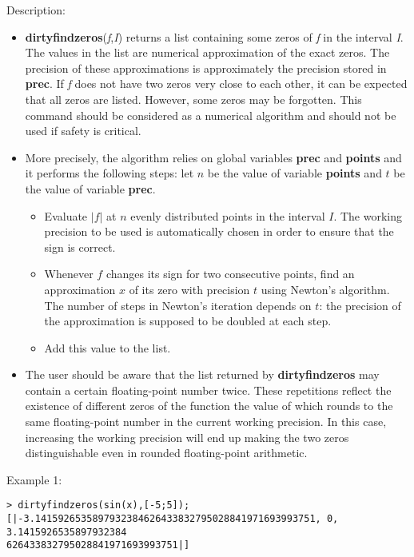 \noindent Description: \begin{itemize}

\item \textbf{dirtyfindzeros}(\emph{f},\emph{I}) returns a list containing some zeros of \emph{f} in the
   interval \emph{I}. The values in the list are numerical approximation of the exact
   zeros. The precision of these approximations is approximately the precision
   stored in \textbf{prec}. If \emph{f} does not have two zeros very close to each other, it 
   can be expected that all zeros are listed. However, some zeros may be
   forgotten. This command should be considered as a numerical algorithm and
   should not be used if safety is critical.

\item More precisely, the algorithm relies on global variables \textbf{prec} and \textbf{points} and it performs the following steps: 
   let $n$ be the value of variable \textbf{points} and $t$ be the value
   of variable \textbf{prec}.
   \begin{itemize}
   \item Evaluate $|f|$ at $n$ evenly distributed points in the interval $I$.
     The working precision to be used is automatically chosen in order to ensure that the sign
     is correct.
   \item Whenever $f$ changes its sign for two consecutive points,
     find an approximation $x$ of its zero with precision $t$ using
     Newton's algorithm. The number of steps in Newton's iteration depends on $t$:
     the precision of the approximation is supposed to be doubled at each step.
   \item Add this value to the list.
   \end{itemize}

\item The user should be aware that the list returned by \textbf{dirtyfindzeros} may
   contain a certain floating-point number twice. These repetitions
   reflect the existence of different zeros of the function the value of
   which rounds to the same floating-point number in the current working
   precision. In this case, increasing the working precision will end up
   making the two zeros distinguishable even in rounded floating-point
   arithmetic.
\end{itemize}
\noindent Example 1: 
\begin{center}\begin{minipage}{15cm}\begin{Verbatim}[frame=single,commandchars=\\\|\~]
> dirtyfindzeros(sin(x),[-5;5]);
[|-3.1415926535897932384626433832795028841971693993751, 0, 3.1415926535897932384
626433832795028841971693993751|]
\end{Verbatim}
\end{minipage}\end{center}
